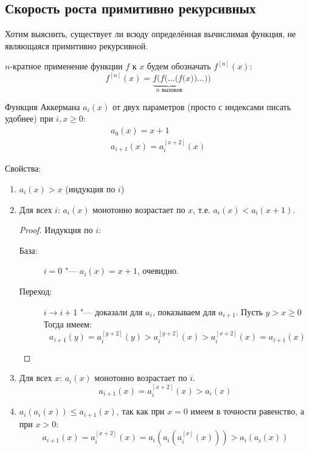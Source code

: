 \subsection{Скорость роста примитивно рекурсивных}

Хотим выяснить, существует ли всюду определённая вычислимая функция, не являющаяся
примитивно рекурсивной.

\begin{Def}
	$n$-кратное применение функции $f$ к $x$ будем обозначать $f^{[n]}(x)$:
	\[ f^{[n]}(x)=\underbrace{f(f(\dots(f(}_{n\text{ вызовов}}x))\dots)) \]
\end{Def}
\begin{Def}
	Функция Аккермана $a_i(x)$ от двух параметров (просто с индексами писать удобнее) при $i, x \ge 0$:
	\begin{gather*}
		a_0(x) = x + 1 \\
		a_{i+1}(x) = a_i^{[x+2]}(x)
	\end{gather*}
\end{Def}
Свойства:
\begin{enumerate}
	\item $a_i(x) > x$ (индукция по $i$)
	\item Для всех $i$: $a_i(x)$ монотонно возрастает по $x$, т.е. $a_i(x) < a_i(x+1)$.
		\begin{proof}
			Индукция по $i$:
			\begin{description}
				\item[База:]
					$i=0$ "--- $a_i(x) = x + 1$, очевидно.
				\item[Переход:]
					$i \to i + 1$ "--- доказали для $a_i$, показываем для $a_{i+1}$.
					Пусть $y > x \ge 0$
					Тогда имеем:
					\[ a_{i+1}(y)=a_i^{[y+2]}(y) > a_i^{[y+2]}(x) > a_i^{[x+2]}(x) = a_{i+1}(x) \]
			\end{description}
		\end{proof}
	\item
		Для всех $x$: $a_i(x)$ монотонно возрастает по $i$.
		\[ a_{i+1}(x) = a_i^{[x+2]}(x) > a_i(x) \]
	\item
		$a_i(a_i(x)) \le a_{i+1}(x)$, так как при $x=0$ имеем в точности равенство, а при $x>0$:
		\[ a_{i+1}(x) = a_i^{[x+2]}(x) = a_i(a_i(a_i^{[x]}(x))) > a_i(a_i(x)) \]
\end{enumerate}

